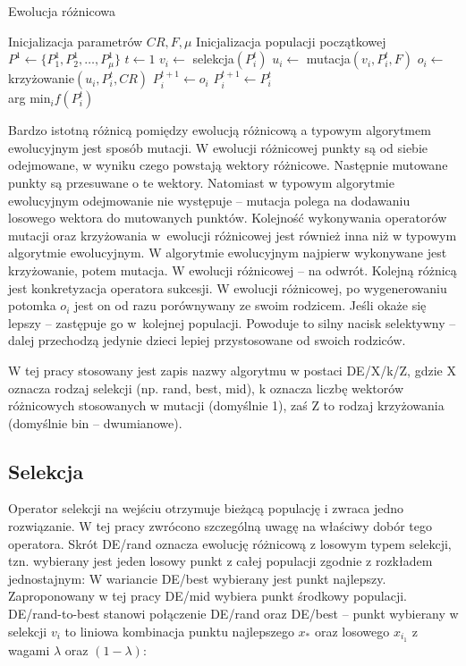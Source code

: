 \documentclass[a4paper,onecolumn,oneside,12pt,wide,floatssmall]{mwrep}
\theoremstyle{definition}
\theoremstyle{plain}%
\theoremstyle{remark}
\begin{document}
\begin{algorithm}[H]
\caption{Ewolucja różnicowa}
\label{algorithm:de}
\begin{algorithmic}[1]
\State Inicjalizacja parametrów $CR, F, \mu$
\State Inicjalizacja populacji początkowej $P^1 \gets \{P^1_1, P^1_2, \ldots, P^1_\mu\}$
\State $t \gets 1$
    \State $v_i \gets$ selekcja$(P^t_i)$
    \State $u_i \gets$ mutacja$(v_i, P^t_i, F)$ 
    \State $o_i \gets$ krzy{\.z}owanie$(u_i, P_i^t, CR)$    
        
      \State $P_i^{t+1} \gets o_i$     
    \Else 
      \State $P_i^{t+1} \gets P_i^{t}$
    \EndIf {}
  \EndFor
\EndWhile \\
\Return arg min$_i f(P^t_i)$ 
\end{algorithmic}
\end{algorithm}

Bardzo istotną różnicą pomiędzy ewolucją różnicową a typowym algorytmem ewolucyjnym jest sposób mutacji.
W ewolucji różnicowej punkty są od siebie odejmowane, w wyniku czego powstają wektory różnicowe. 
Następnie mutowane punkty są przesuwane o te wektory. Natomiast w typowym algorytmie ewolucyjnym
odejmowanie nie występuje -- mutacja polega na dodawaniu losowego wektora do mutowanych punktów.
Kolejność wykonywania operatorów mutacji oraz krzyżowania w~ewolucji różnicowej
jest również inna niż w typowym algorytmie ewolucyjnym.
W algorytmie ewolucyjnym najpierw wykonywane jest krzyżowanie, potem mutacja.
W ewolucji różnicowej -- na odwrót.
Kolejną różnicą jest konkretyzacja operatora sukcesji. W ewolucji różnicowej, po wygenerowaniu potomka
$o_i$ jest on od razu porównywany ze swoim rodzicem. Jeśli okaże się lepszy -- zastępuje go
w~kolejnej populacji. Powoduje to silny nacisk selektywny -- dalej przechodzą jedynie dzieci
lepiej przystosowane od swoich rodziców.

W tej pracy stosowany jest zapis nazwy algorytmu w postaci \mbox{DE/X/k/Z},
gdzie X oznacza rodzaj selekcji (np. rand, best, mid), k oznacza liczbę wektorów różnicowych stosowanych
w mutacji (domyślnie 1), zaś Z to rodzaj krzyżowania (domyślnie bin -- dwumianowe).

\subsection{Selekcja}

Operator selekcji na wejściu otrzymuje bieżącą populację i zwraca jedno rozwiązanie.
W tej pracy zwrócono szczególną uwagę na właściwy dobór tego operatora.
Skrót DE/rand oznacza ewolucję różnicową z losowym typem selekcji, tzn. wybierany jest jeden
losowy punkt z całej populacji zgodnie z rozkładem jednostajnym:
W wariancie DE/best wybierany jest punkt najlepszy. Zaproponowany w tej pracy DE/mid wybiera
punkt środkowy populacji. 
DE/rand-to-best stanowi połączenie DE/rand oraz DE/best -- punkt wybierany w selekcji $v_i$ 
to liniowa kombinacja punktu najlepszego $x_*$ oraz losowego $x_{i_1}$ z wagami $\lambda$ oraz $(1 - \lambda)$:
\end{document}

